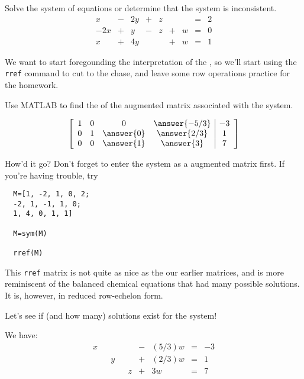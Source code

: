 \documentclass{ximera}
\begin{document}
 
\begin{example}\label{ex:freevar1} Solve the system of equations or determine that the system is inconsistent.
$$\begin{array}{ccccccccc}
      x &- &2y&+&z&&&= &2 \\
     -2x& +&y&-&z&+&w&=&0\\
     x& +&4y&&&+&w&=&1
    \end{array}$$



We want to start foregounding the interpretation of the \rref, so we'll start using the \texttt{rref} command to cut to the chase, and leave some row operations practice for the homework.

Use MATLAB to find the \rref of the augmented matrix associated with the system. 



\[\left[\begin{array}{cccc|c} 
 1&0&0&\answer{-5/3}&-3\\0&1&\answer{0}&\answer{2/3}&1\\0&0&\answer{1}&\answer{3}&7
 \end{array}\right]\]



 \begin{feedback}
 
  How'd it go? Don't forget to enter the system as a augmented matrix first. If you're having trouble, try

  \begin{verbatim}
  M=[1, -2, 1, 0, 2;
  -2, 1, -1, 1, 0;
  1, 4, 0, 1, 1]

  M=sym(M)

  rref(M)
  \end{verbatim}

 \end{feedback}
  
This \texttt{rref} matrix is not quite as nice as the our earlier matrices, and is more reminiscent of the balanced chemical equations that had many possible solutions. It is, however, in reduced row-echelon form.  

Let's see if (and how many) solutions exist for the system!

We have:
 $$\begin{array}{ccccccccc}
      x & &&&&-&(5/3)w&= &-3 \\
     & &y&&&+&(2/3)w&=&1\\
     & &&&z&+&3w&=&7
    \end{array}$$


\end{example}
\end{document}
